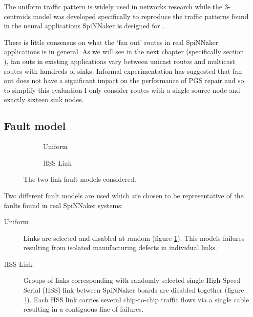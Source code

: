 			The uniform traffic pattern is widely used in networks research
			\cite{dally04,davies12} while the 3-centroids model was developed
			specifically to reproduce the traffic patterns found in the neural
			applications SpiNNaker is designed for \cite{navaridas14}.
			
			There is little consensus on what the `fan out' routes in real SpiNNaker
			applications is in general. As we will see in the next chapter
			(specifically section \label{sec:existing-applications}), fan outs in
			existing applications vary between unicast routes and multicast routes
			with hundreds of sinks. Informal experimentation has suggested that fan
			out does not have a significant impact on the performance of PGS repair
			and so to simplify this evaluation I only consider routes with a single
			source node and exactly sixteen sink nodes.
		
		\subsection{Fault model}
			
			\begin{figure}
				\center
				\begin{subfigure}{0.48\linewidth}
					\hspace*{-1.5cm}
					
					\caption{Uniform}
					\label{fig:fault-example-uniform}
				\end{subfigure}
				\begin{subfigure}{0.48\linewidth}
					\hspace*{-1.5cm}
					
					\caption{HSS Link}
					\label{fig:fault-example-hss}
				\end{subfigure}
				
				\caption{The two link fault models considered.}
				\label{fig:fault-example}
			\end{figure}
			
			Two different fault models are used which are chosen to be representative
			of the faults found in real SpiNNaker systems:
			
			\begin{description}
				
				\item[Uniform] Links are selected and disabled at random (figure
				\ref{fig:fault-example-uniform}). This models failures resulting from
				isolated manufacturing defects in individual links.
				
				\item[HSS Link] Groups of links corresponding with randomly selected
				single High-Speed Serial (HSS) link between SpiNNaker boards are
				disabled together (figure \ref{fig:fault-example-uniform}). Each HSS
				link carries several chip-to-chip traffic flows via a single cable
				resulting in a contiguous line of failures.
				
			\end{description}
			
